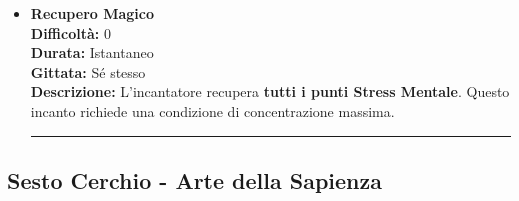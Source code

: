 \documentclass[./magie.tex]{subfiles}
\begin{document}
\begin{itemize}
\noindent
\begin{center}
\rule{\textwidth}{0.4pt} 
\end{center}
\vspace{0.2cm}

\item \textbf{Recupero Magico} \\
\textbf{Difficoltà:} 0 \\
\textbf{Durata:} Istantaneo \\
\textbf{Gittata:} Sé stesso \\
\textbf{Descrizione:} L'incantatore recupera \textbf{tutti i punti Stress Mentale}. Questo incanto richiede una condizione di concentrazione massima.

\vspace{0.2cm}
\noindent
\begin{center}
\rule{\textwidth}{0.4pt} 
\end{center}
\vspace{0.2cm}

\end{itemize}

\clearpage
\subsection*{Sesto Cerchio - Arte della Sapienza}
\end{document}
